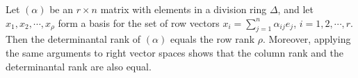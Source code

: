 Let $(\alpha)$ be an $r \times n$ matrix with elements in a division ring $\Delta$, and let $x_1, x_2, \cdots, x_\rho$ form a basis for the set of row vectors $x_i = \sum_{j=1}^{n} \alpha_{ij} e_j$, $i = 1, 2, \cdots, r$. Then the determinantal rank of $(\alpha)$ equals the row rank $\rho$. Moreover, applying the same arguments to right vector spaces shows that the column rank and the determinantal rank are also equal.
